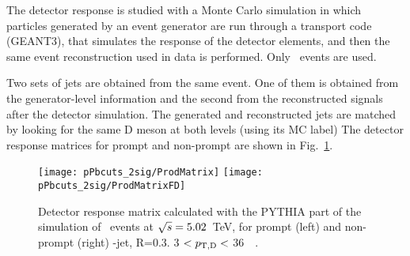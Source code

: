 The detector response is studied with a Monte Carlo simulation in which particles generated by an event generator are
run through a transport code (GEANT3), that simulates the response of the detector elements, and then the same event reconstruction used in data is performed. Only \ccbar\ events are used.

Two sets of jets are obtained from the same event. One of them is obtained from the generator-level information and the second from the reconstructed signals after the detector simulation. 
The generated and reconstructed jets are matched by looking for the same D meson at both levels (using its MC label)
The detector response matrices for prompt and non-prompt are shown in Fig.~\ref{fig:fRMdet_pPb_Dzero}.

\begin{figure}[bth]
\centering
\texttt{[image: pPbcuts\_2sig/ProdMatrix]}
\texttt{[image: pPbcuts\_2sig/ProdMatrixFD]}
\caption{Detector response matrix calculated with the PYTHIA part of the simulation of \pp\ events at $\sqrt{s}=5.02$~TeV, for prompt (left) and non-prompt (right) \Dzero-jet, R=0.3. 3 $< p_{\mathrm{T,D}} < $ 36~\GeVc\ .}
\label{fig:fRMdet_pPb_Dzero}
\end{figure}

